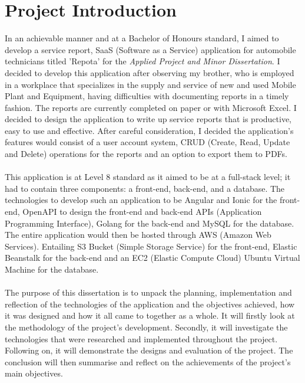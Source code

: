 \section{Project Introduction}
In an achievable manner and at a Bachelor of Honours standard, I aimed to develop a service report, SaaS (Software as a Service) application for automobile technicians titled 'Repota' for the \textit{Applied Project and Minor Dissertation}. I decided to develop this application after observing my brother, who is employed in a workplace that specializes in the supply and service of new and used Mobile Plant and Equipment, having difficulties with documenting reports in a timely fashion. The reports are currently completed on paper or with Microsoft Excel. I decided to design the application to write up service reports that is productive, easy to use and effective. After careful consideration, I decided the application's features would consist of a user account system, CRUD (Create, Read, Update and Delete) operations for the reports and an option to export them to PDFs.
\\\\ This application is at Level 8 standard as it aimed to be at a full-stack level; it had to contain three components: a front-end, back-end, and a database. The technologies to develop such an application to be Angular and Ionic for the front-end, OpenAPI to design the front-end and back-end APIs (Application Programming Interface), Golang for the back-end and MySQL for the database. The entire application would then be hosted through AWS (Amazon Web Services). Entailing S3 Bucket (Simple Storage Service) for the front-end, Elastic Beanstalk for the back-end and an EC2 (Elastic Compute Cloud) Ubuntu Virtual Machine for the database.
\\\\ The purpose of this dissertation is to unpack the planning, implementation and reflection of the technologies of the application and the objectives achieved, how it was designed and how it all came to together as a whole. It will firstly look at the methodology of the project's development. Secondly, it will investigate the technologies that were researched and implemented throughout the project. Following on, it will demonstrate the designs and evaluation of the project. The conclusion will then summarise and reflect on the achievements of the project's main objectives.

